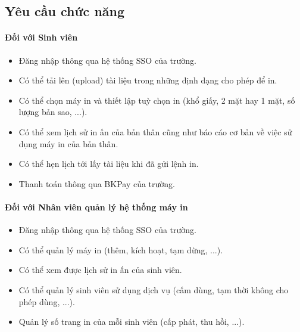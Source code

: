 \documentclass[a4paper]{article}
\begin{document}
\subsection{Yêu cầu chức năng}
\paragraph*{Đối với Sinh viên}
\begin{itemize}
    \item Đăng nhập thông qua hệ thống SSO của trường.
    \item Có thể tải lên (upload) tài liệu trong những định dạng cho phép để in.
    \item Có thể chọn máy in và thiết lập tuỳ chọn in (khổ giấy, 2 mặt hay 1 mặt, số lượng bản sao, ...).
    \item Có thể xem lịch sử in ấn của bản thân cũng như báo cáo cơ bản về việc sử dụng máy in của bản thân.
    \item Có thể hẹn lịch tới lấy tài liệu khi đã gửi lệnh in.
    \item Thanh toán thông qua BKPay của trường.
\end{itemize}

\paragraph*{Đối với Nhân viên quản lý hệ thống máy in}
\begin{itemize}
    \item Đăng nhập thông qua hệ thống SSO của trường.
    \item Có thể quản lý máy in (thêm, kích hoạt, tạm dừng, ...).
    \item Có thể xem được lịch sử in ấn của sinh viên.
    \item Có thể quản lý sinh viên sử dụng dịch vụ (cấm dùng, tạm thời không cho phép dùng, ...).
    \item Quản lý số trang in của mỗi sinh viên (cấp phát, thu hồi, ...).
\end{itemize}
\end{document}
